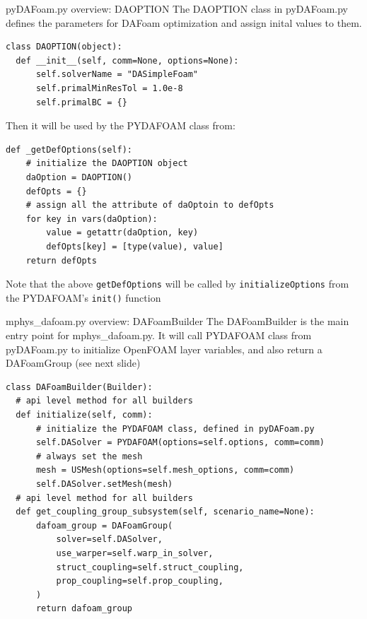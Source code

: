 \documentclass{bredelebeamer}
\begin{document}
\begin{frame}[fragile]{pyDAFoam.py overview: DAOPTION}
The DAOPTION class in pyDAFoam.py defines the parameters for DAFoam optimization and assign inital values to them.
\footnotesize
\lstset{ language=python }
\begin{lstlisting}
class DAOPTION(object):
  def __init__(self, comm=None, options=None):
      self.solverName = "DASimpleFoam"
      self.primalMinResTol = 1.0e-8
      self.primalBC = {}
\end{lstlisting}
\normalsize

Then it will be used by the PYDAFOAM class from:

\footnotesize
\lstset{ language=python }
\begin{lstlisting}
def _getDefOptions(self):
    # initialize the DAOPTION object
    daOption = DAOPTION()
    defOpts = {}
    # assign all the attribute of daOptoin to defOpts
    for key in vars(daOption):
        value = getattr(daOption, key)
        defOpts[key] = [type(value), value]
    return defOpts
\end{lstlisting}
\normalsize

Note that the above \texttt{getDefOptions} will be called by \texttt{initializeOptions} from the PYDAFOAM's \texttt{init()} function

\end{frame}

\begin{frame}[fragile]{mphys\_dafoam.py overview: DAFoamBuilder}
The DAFoamBuilder is the main entry point for mphys\_dafoam.py. It will call PYDAFOAM class from pyDAFoam.py to initialize OpenFOAM layer variables, and also return a DAFoamGroup (see next slide)
\footnotesize
\lstset{ language=python }
\begin{lstlisting}
class DAFoamBuilder(Builder):
  # api level method for all builders
  def initialize(self, comm):
      # initialize the PYDAFOAM class, defined in pyDAFoam.py
      self.DASolver = PYDAFOAM(options=self.options, comm=comm)
      # always set the mesh
      mesh = USMesh(options=self.mesh_options, comm=comm)
      self.DASolver.setMesh(mesh)
  # api level method for all builders
  def get_coupling_group_subsystem(self, scenario_name=None):
      dafoam_group = DAFoamGroup(
          solver=self.DASolver,
          use_warper=self.warp_in_solver,
          struct_coupling=self.struct_coupling,
          prop_coupling=self.prop_coupling,
      )
      return dafoam_group
\end{lstlisting}
\normalsize

\end{frame}
\end{document}
